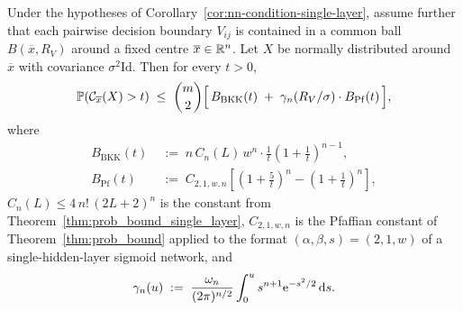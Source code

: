 \begin{proposition}\label{prop:single-layer-gaussian}
  Under the hypotheses of Corollary~\ref{cor:nn-condition-single-layer}, assume further that each pairwise decision boundary $V_{ij}$ is contained in a common ball $B(\overline x, R_V)$ around a fixed centre $\overline x \in \mathbb{R}^n$. Let $X$ be normally distributed around $\overline x$ with covariance $\sigma^2\mathrm{Id}$. Then for every $t > 0$,
  \begin{equation}\label{eq:single-layer-gaussian-bound}
    \mathbb{P}(\mathcal{C}_{\overline x}(X) > t) \;\leq\; \binom{m}{2}\Bigl[\,B_{\mathrm{BKK}}(t) \;+\; \gamma_n(R_V/\sigma)\cdot B_{\mathrm{Pf}}(t)\,\Bigr],
  \end{equation}
  where
  \begin{align*}
    B_{\mathrm{BKK}}(t) &\;:=\; n\,C_n(L)\,w^n\cdot\frac{1}{t}\!\left(1+\frac{1}{t}\right)^{\!n-1},\\
    B_{\mathrm{Pf}}(t) &\;:=\; C_{2,1,w,n}\!\left[\left(1+\frac{5}{t}\right)^{\!n} - \left(1+\frac{1}{t}\right)^{\!n}\right],
  \end{align*}
  $C_n(L) \leq 4\,n!\,(2L+2)^n$ is the constant from Theorem~\ref{thm:prob_bound_single_layer}, $C_{2,1,w,n}$ is the Pfaffian constant of Theorem~\ref{thm:prob_bound} applied to the format $(\alpha,\beta,s) = (2,1,w)$ of a single-hidden-layer sigmoid network, and
  \begin{equation*}
    \gamma_n(u) \;:=\; \frac{\omega_n}{(2\pi)^{n/2}}\int_0^u s^{n+1}\mathrm{e}^{-s^2/2}\,\mathrm{d}{s}.
  \end{equation*}
\end{proposition}

